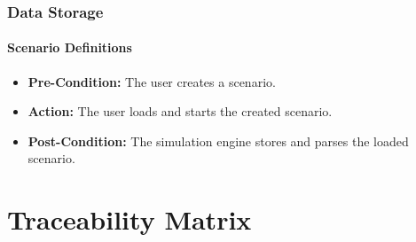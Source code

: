 \documentclass[titlepage]{article}
\newcommand{\testentry}[4]{
    \paragraph{#1}
    \begin{itemize}
        \item \textbf{Pre-Condition:} #2
        \item \textbf{Action:} #3
        \item \textbf{Post-Condition:} #4
    \end{itemize}
}
\begin{document}

\subsubsection{Data Storage%
  \label{data-storage}%
}
    \testentry{Scenario Definitions}{ 
        The user creates a scenario.
    }{
        The user loads and starts the created scenario.
    }{
        The simulation engine stores and parses the loaded scenario.
    }

\pagebreak
\section{Traceability Matrix%
  \label{Traceability Matrix}%
}
\end{document}

